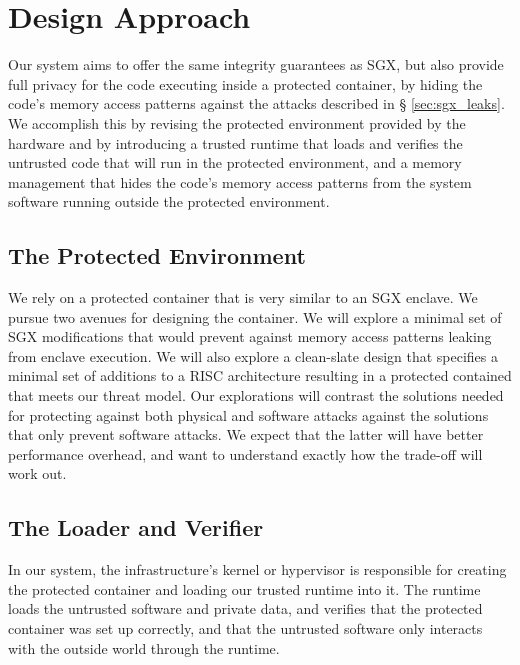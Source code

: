 \section{Design Approach}
\label{sec:design}

Our system aims to offer the same integrity guarantees as SGX, but also provide
full privacy for the code executing inside a protected container, by hiding the
code's memory access patterns against the attacks described in \S
\ref{sec:sgx_leaks}. We accomplish this by revising the protected environment
provided by the hardware and by introducing a trusted runtime that loads and
verifies the untrusted code that will run in the protected environment, and a
memory management that hides the code's memory access patterns from the
system software running outside the protected environment.


\subsection{The Protected Environment}
\label{sec:protected_environment}

We rely on a protected container that is very similar to an SGX enclave. We
pursue two avenues for designing the container. We will explore a minimal set
of SGX modifications that would prevent against memory access patterns leaking
from enclave execution. We will also explore a clean-slate design that
specifies a minimal set of additions to a RISC architecture resulting in a
protected contained that meets our threat model. Our explorations will contrast
the solutions needed for protecting against both physical and software attacks
against the solutions that only prevent software attacks. We expect that the
latter will have better performance overhead, and want to understand exactly
how the trade-off will work out.


\subsection{The Loader and Verifier}
\label{sec:loader_verifier}

In our system, the infrastructure's kernel or hypervisor is responsible for
creating the protected container and loading our trusted runtime into it. The
runtime loads the untrusted software and private data, and verifies that the
protected container was set up correctly, and that the untrusted software
only interacts with the outside world through the runtime.

